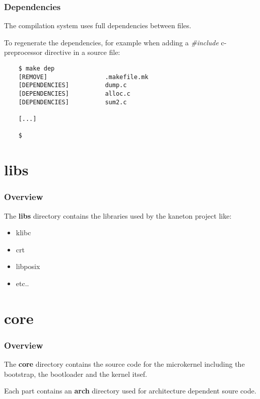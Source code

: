 
\begin{frame}[containsverbatim]
  \frametitle{Dependencies}

  The compilation system uses full dependencies between files.

  \nl

  To regenerate the dependencies, for example when adding a
  \textit{\#include} c-preprocessor directive in a source file:

  \begin{verbatim}
    $ make dep
    [REMOVE]                .makefile.mk
    [DEPENDENCIES]          dump.c
    [DEPENDENCIES]          alloc.c
    [DEPENDENCIES]          sum2.c

    [...]

    $
  \end{verbatim}
\end{frame}

%
%

\section{libs}


\begin{frame}
  \frametitle{Overview}

  The \textbf{libs} directory contains the libraries used by the kaneton
  project like:

  \begin{itemize}
    \item
      klibc
    \item
      crt
    \item
      libposix
    \item
      etc..
  \end{itemize}
\end{frame}

%
%

\section{core}


\begin{frame}
  \frametitle{Overview}

  The \textbf{core} directory contains the source code for the microkernel
  including the bootstrap, the bootloader and the kernel itsef.

  \nl

  Each part contains an \textbf{arch} directory used for architecture
  dependent soure code.
\end{frame}

